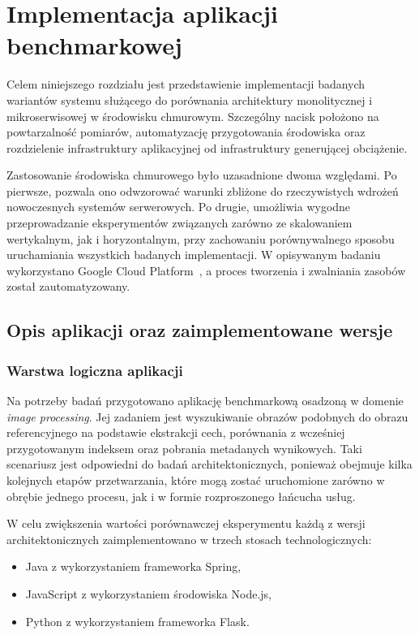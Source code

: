 \chapter{Implementacja aplikacji benchmarkowej}
\label{chapter:implementation}

Celem niniejszego rozdziału jest przedstawienie implementacji badanych wariantów systemu służącego do porównania architektury monolitycznej i mikroserwisowej w środowisku chmurowym. Szczególny nacisk położono na powtarzalność pomiarów, automatyzację przygotowania środowiska oraz rozdzielenie infrastruktury aplikacyjnej od infrastruktury generującej obciążenie.

Zastosowanie środowiska chmurowego było uzasadnione dwoma względami. Po pierwsze, pozwala ono odwzorować warunki zbliżone do rzeczywistych wdrożeń nowoczesnych systemów serwerowych. Po drugie, umożliwia wygodne przeprowadzanie eksperymentów związanych zarówno ze skalowaniem wertykalnym, jak i horyzontalnym, przy zachowaniu porównywalnego sposobu uruchamiania wszystkich badanych implementacji. W opisywanym badaniu wykorzystano Google Cloud Platform~\cite{gcpcomputedocs}, a proces tworzenia i zwalniania zasobów został zautomatyzowany.

\section{Opis aplikacji oraz zaimplementowane wersje}

\subsection{Warstwa logiczna aplikacji}

Na potrzeby badań przygotowano aplikację benchmarkową osadzoną w domenie \textit{image processing}. Jej zadaniem jest wyszukiwanie obrazów podobnych do obrazu referencyjnego na podstawie ekstrakcji cech, porównania z wcześniej przygotowanym indeksem oraz pobrania metadanych wynikowych. Taki scenariusz jest odpowiedni do badań architektonicznych, ponieważ obejmuje kilka kolejnych etapów przetwarzania, które mogą zostać uruchomione zarówno w obrębie jednego procesu, jak i w formie rozproszonego łańcucha usług.

W celu zwiększenia wartości porównawczej eksperymentu każdą z wersji architektonicznych zaimplementowano w trzech stosach technologicznych:
\begin{itemize}
    \item Java z wykorzystaniem frameworka Spring,
    \item JavaScript z wykorzystaniem środowiska Node.js,
    \item Python z wykorzystaniem frameworka Flask.
\end{itemize}

